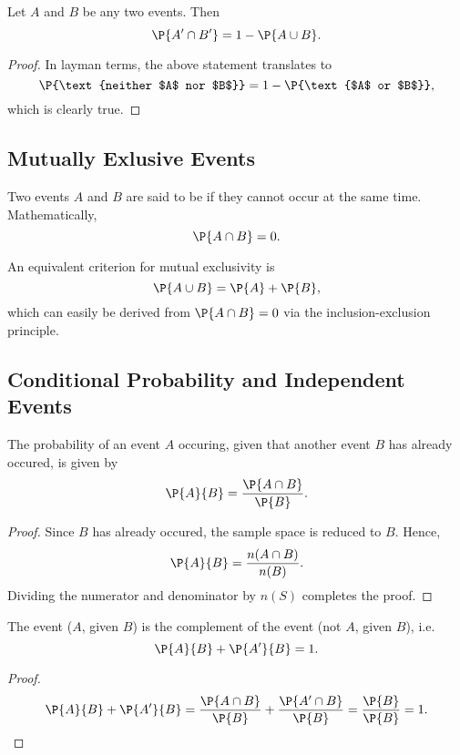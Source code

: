 \begin{proposition}
    Let $A$ and $B$ be any two events. Then \[\P{A' \cap B'} = 1 - \P{A \cup B}.\]
\end{proposition}
\begin{proof}
    In layman terms, the above statement translates to \[\P{\text{neither $A$ nor $B$}} = 1 - \P{\text{$A$ or $B$}},\] which is clearly true.
\end{proof}

\subsection{Mutually Exlusive Events}

\begin{definition}
    Two events $A$ and $B$ are said to be  if they cannot occur at the same time. Mathematically, \[\P{A \cap B} = 0.\]
\end{definition}

An equivalent criterion for mutual exclusivity is \[\P{A \cup B} = \P{A} + \P{B},\] which can easily be derived from $\P{A \cap B} = 0$ via the inclusion-exclusion principle.

\subsection{Conditional Probability and Independent Events}

\begin{proposition}
    The probability of an event $A$ occuring, given that another event $B$ has already occured, is given by \[\P{A}{B} = \frac{\P{A \cap B}}{\P{B}}.\]
\end{proposition}
\begin{proof}
    Since $B$ has already occured, the sample space is reduced to $B$. Hence, \[\P{A}{B} = \frac{n(A \cap B)}{n(B)}.\] Dividing the numerator and denominator by $n(S)$ completes the proof.
\end{proof}

\begin{corollary}
    The event ($A$, given $B$) is the complement of the event (not $A$, given $B$), i.e. \[\P{A}{B} + \P{A'}{B} = 1.\]
\end{corollary}
\begin{proof}
    \[\P{A}{B} + \P{A'}{B} = \frac{\P{A \cap B}}{\P{B}} + \frac{\P{A' \cap B}}{\P{B}} = \frac{\P{B}}{\P{B}} = 1.\]
\end{proof}

